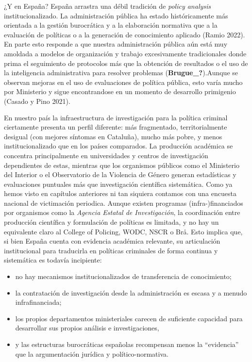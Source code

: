 \documentclass[
  spanish,
  letterpaper,
  DIV=11,
  numbers=noendperiod]{scrreprt}
\begin{document}
¿Y en España? España arrastra una débil tradición de \emph{policy
analysis} institucionalizado. La administración pública ha estado
históricamente más orientada a la gestión burocrática y a la elaboración
normativa que a la evaluación de políticas o a la generación de
conocimiento aplicado (Ramio 2022). En parte esto responde a que nuestra
administración pública aún está muy amoldada a modelos de organización y
trabajo excesivamente tradicionales donde prima el seguimiento de
protocolos más que la obtención de resultados o el uso de la
inteligencia administrativa para resolver problemas
(\textbf{Brugue\_?}).Aunque se observan mejoras en el uso de
evaluaciones de política pública, esto varía mucho por Ministerio y
sigue encontrandose en un momento de desarrollo primigenio (Casado y
Pino 2021).

En nuestro país la infraestructura de investigación para la política
criminal ciertamente presenta un perfil diferente: más fragmentado,
territorialmente desigual (con mejores síntomas en Cataluña), mucho más
pobre, y menos institucionalizado que en los países comparados. La
producción académica se concentra principalmente en universidades y
centros de investigación dependientes de estas, mientras que los
organismos públicos como el Ministerio del Interior o el Observatorio de
la Violencia de Género generan estadísticas y evaluaciones puntuales más
que investigación científica sistemática. Como ya hemos visto en
capítulos anteriores ni tan siquiera contamos con una encuesta nacional
de victimación periodica. Aunque existen programas (infra-)financiados
por organismos como la \emph{Agencia Estatal de Investigación}, la
coordinación entre producción científica y formulación de políticas es
limitada, y no hay un equivalente claro al College of Policing, WODC,
NSCR o Brå. Esto implica que, si bien España cuenta con evidencia
académica relevante, su articulación institucional para traducirla en
políticas criminales de forma continua y sistemática es todavía
incipiente:

\begin{itemize}
\item
  no hay mecanismos institucionalizados de transferencia de
  conocimiento;
\item
  la contratación de investigación desde la administración es escasa y a
  menudo infrafinanciada;
\item
  los propios departamentos ministeriales carecen de suficiente
  capacidad para desarrollar sus propios análisis e investigaciones,
\item
  y las estructuras burocráticas españolas recompensan menos la
  ``evidencia'' que la argumentación jurídica y político-normativa.
\end{itemize}
\end{document}
